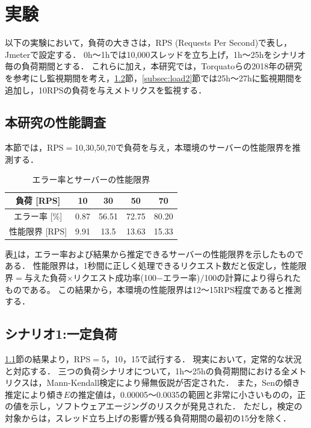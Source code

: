 \documentclass[twoside,twocolumn,10pt]{jarticle}  %
\begin{document}
\section{実験}
以下の実験において，負荷の大きさは，RPS (Requests Per Second)で表し，Jmeterで設定する．
0h～1hでは10,000スレッドを立ち上げ，1h～25hをシナリオ毎の負荷期間とする．
これらに加え，本研究では，Torquatoらの2018年の研究を参考にし監視期間を考え，\ref{subsec:load1}節，\ref{subsec:load2}節では25h～27hに監視期間を追加し，10RPSの負荷を与えメトリクスを監視する．

\subsection{本研究の性能調査}
\label{subsec:limit}
本節では，RPS$=$10,30,50,70で負荷を与え，本環境のサーバーの性能限界を推測する．
\begin{table}[h]
  \centering
  \caption{エラー率とサーバーの性能限界}
  \label{tab:rps}
  \begin{tabular}{ccccc}
    \hline \hline
    負荷 [RPS] & 10 & 30 & 50 & 70 \\ \hline
    エラー率 [\%] & 0.87 & 56.51 & 72.75 & 80.20 \\ \hline
    性能限界 [RPS] & 9.91 & 13.5 & 13.63 & 15.33 \\ \hline
  \end{tabular}
\end{table}

表\ref{tab:rps}は，エラー率および結果から推定できるサーバーの性能限界を示したものである．
性能限界は，1秒間に正しく処理できるリクエスト数だと仮定し，性能限界$=$与えた負荷$×$リクエスト成功率(100$-$エラー率)$/$100の計算により得られたものである。
この結果から，本環境の性能限界は12～15RPS程度であると推測する．

\subsection{シナリオ1:一定負荷}\label{subsec:load1}
\ref{subsec:limit}節の結果より，RPS$=$5，10，15で試行する．
現実において，定常的な状況と対応する．
三つの負荷シナリオについて，1h～25hの負荷期間における全メトリクスは，Mann-Kendall検定\cite{Mann1945Nonparametric}により帰無仮説が否定された．
また，Senの傾き推定\cite{Sen1968Estimates}により傾き$E$の推定値は，0.00005～0.0035の範囲と非常に小さいものの，正の値を示し，ソフトウェアエージングのリスクが発見された．
ただし，検定の対象からは，スレッド立ち上げの影響が残る負荷期間の最初の15分を除く．
\end{document}
